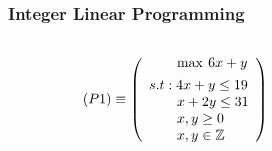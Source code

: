 \documentclass{beamer}
\begin{document}
    \begin{frame}
        \frametitle{Integer Linear Programming}
        
        \begin{columns}[T] %
        \begin{column}{.48\textwidth}
        \begin{equation*}
            (P1) \equiv 	\left( \begin{array}{l}
	                        \qquad \max \hspace{2pt}  6x + y  \vspace{4pt} \\ 
	                        s.t: 4x + y \leq 19 \\
	                        \qquad x + 2y \leq 31 \\
	                        \qquad x,y\geq 0 \\
	                        \qquad x,y \in \mathbb{Z}
	                        \end{array} \right)
        \end{equation*}
        \end{column}%
        \hfill%
        \begin{column}{.48\textwidth}

\end{column}
\end{columns}
\end{frame}
\end{document}
